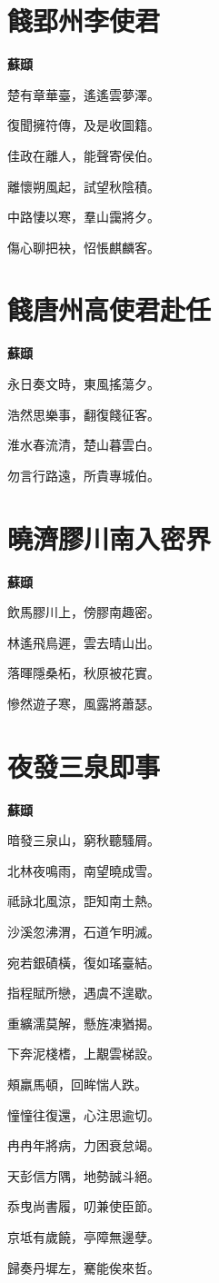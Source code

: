 \documentclass[12pt,a4paper]{ctexbook}
\begin{document}
\section{餞郢州李使君}
\textbf{蘇頲}\par\vspace{0.5em}
楚有章華臺，遙遙雲夢澤。\par
復聞擁符傳，及是收圖籍。\par
佳政在離人，能聲寄侯伯。\par
離懷朔風起，試望秋陰積。\par
中路悽以寒，羣山靄將夕。\par
傷心聊把袂，怊悵麒麟客。\par

\section{餞唐州高使君赴任}
\textbf{蘇頲}\par\vspace{0.5em}
永日奏文時，東風搖蕩夕。\par
浩然思樂事，翻復餞征客。\par
淮水春流清，楚山暮雲白。\par
勿言行路遠，所貴專城伯。\par

\section{曉濟膠川南入密界}
\textbf{蘇頲}\par\vspace{0.5em}
飲馬膠川上，傍膠南趣密。\par
林遙飛鳥遲，雲去晴山出。\par
落暉隱桑柘，秋原被花實。\par
慘然遊子寒，風露將蕭瑟。\par

\section{夜發三泉即事}
\textbf{蘇頲}\par\vspace{0.5em}
暗發三泉山，窮秋聽騷屑。\par
北林夜鳴雨，南望曉成雪。\par
祗詠北風涼，詎知南土熱。\par
沙溪忽沸渭，石道乍明滅。\par
宛若銀磧橫，復如瑤臺結。\par
指程賦所戀，遇虞不遑歇。\par
重纊濡莫解，懸旌凍猶揭。\par
下奔泥棧榰，上覯雲梯設。\par
[搏]頰羸馬頓，回眸惴人跌。\par
憧憧往復還，心注思逾切。\par
冉冉年將病，力困衰怠竭。\par
天彭信方隅，地勢誠斗絕。\par
忝曳尚書履，叨兼使臣節。\par
京坻有歲饒，亭障無邊孽。\par
歸奏丹墀左，騫能俟來哲。\par
\end{document}
